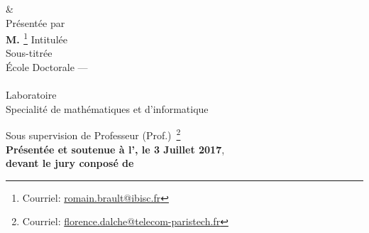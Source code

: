 \begin{titlepage}
\begin{addmargin}[-1cm]{-3cm}
\begin{center}
                {\LARGE \&} \\ {\Huge \color{PSaclay}\textsc{\myUniTP}}
            \endgroup
            \bigskip\vfill
            \begingroup
                Pr\'esent\'ee par \\ {\Large\textbf{M.
                \textsc{\myName}
                }}\footnote{Courriel:
                \href{mailto:ro.brault@gmail.com}{romain.brault@ibisc.fr}}
            \endgroup
            \bigskip\vfill
            \begingroup
                Intitul\'ee \\ \smallskip {\Huge \color{PSaclay}\textsc{\mySubtitle}}
            \endgroup
            \bigskip
            \vfill
            \begingroup
                Sous-titr\'ee \\ {\Large \textbf{\textsc{\myTitle}}}
            \endgroup
            \bigskip
            \vfill
            \begingroup
                \'Ecole Doctorale --- \EDN\\
                \myDoctoralSchool\\
                Laboratoire \myFaculty\\
                Specialit\'e de math\'ematiques et d'informatique
                \medskip
            \endgroup
        \end{center}
        \vspace{1cm}
        \vfill
        \noindent Sous supervision de
        Professeur (Prof.)~\textsc{\mySupervisor}\footnote{Courriel:
        \href{mailto:florence.dalche@telecom-paristech.fr}%
        {florence.dalche@telecom-paristech.fr}}\\
        \smallskip
        \noindent \textbf{Pr\'esent\'ee et soutenue \`a l'\myUniUEVE, le 3
        Juillet 2017}, \\
        \smallskip
        \noindent \textbf{devant le jury conpos\'e de}

\end{addmargin}
\end{titlepage}
